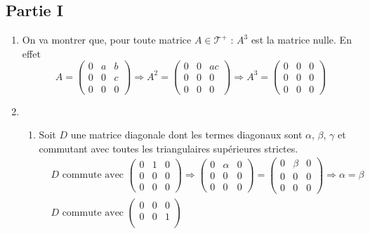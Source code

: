 \subsection*{Partie I}
\begin{enumerate}
 \item On va montrer que, pour toute matrice $A\in\mathcal T^+$ :
 $A^3$ est la matrice nulle.\newline
En effet
\begin{displaymath}
 A=
\begin{pmatrix}
 0 & a & b \\
 0 & 0 & c \\ 
 0 & 0 & 0
\end{pmatrix}
\Rightarrow
A^2=
\begin{pmatrix}
 0 & 0 & ac \\
 0 & 0 & 0 \\ 
 0 & 0 & 0
\end{pmatrix}
\Rightarrow
A^3=
\begin{pmatrix}
 0 & 0 & 0 \\
 0 & 0 & 0 \\ 
 0 & 0 & 0
\end{pmatrix}
\end{displaymath}
\item \begin{enumerate}
 \item 
Soit $D$ une matrice diagonale dont les termes diagonaux sont $\alpha$, $\beta$, $\gamma$ et commutant avec toutes les triangulaires supérieures strictes.
\begin{align*}
 &D \text{ commute avec }
\begin{pmatrix}
 0 & 1 & 0\\
0 & 0 & 0 \\
0 & 0 & 0
\end{pmatrix}
\Rightarrow
\begin{pmatrix}
 0 & \alpha & 0\\
0 & 0 & 0 \\
0 & 0 & 0
\end{pmatrix}
=
\begin{pmatrix}
 0 & \beta & 0\\
0 & 0 & 0 \\
0 & 0 & 0
\end{pmatrix}
\Rightarrow \alpha =\beta \\
 &D \text{ commute avec }
\begin{pmatrix}
 0 & 0 & 0\\
0 & 0 & 1 \\

\end{pmatrix}
\end{align*}
\end{enumerate}
\end{enumerate}
